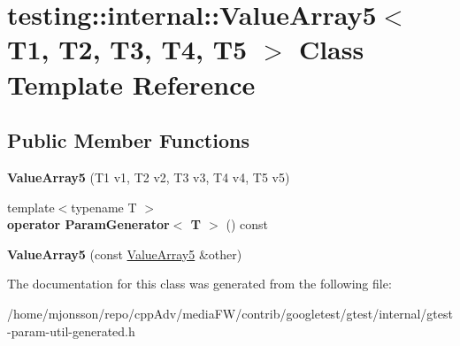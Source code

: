 \hypertarget{classtesting_1_1internal_1_1ValueArray5}{}\section{testing\+:\+:internal\+:\+:Value\+Array5$<$ T1, T2, T3, T4, T5 $>$ Class Template Reference}
\label{classtesting_1_1internal_1_1ValueArray5}
\subsection*{Public Member Functions}
\begin{DoxyCompactItemize}
\item 
\mbox{\label{classtesting_1_1internal_1_1ValueArray5_a9c5687fd18da21263aebc21b9ea508b8}} 
{\bfseries Value\+Array5} (T1 v1, T2 v2, T3 v3, T4 v4, T5 v5)
\item 
\mbox{\label{classtesting_1_1internal_1_1ValueArray5_ab925a168d89be9964c4319e5212222c1}} 
{\footnotesize template$<$typename T $>$ }\\{\bfseries operator Param\+Generator$<$ T $>$} () const
\item 
\mbox{\label{classtesting_1_1internal_1_1ValueArray5_a7de67e844073d0ec3c7c6e5736fb9ba6}} 
{\bfseries Value\+Array5} (const \hyperlink{classtesting_1_1internal_1_1ValueArray5}{Value\+Array5} \&other)
\end{DoxyCompactItemize}


The documentation for this class was generated from the following file\+:\begin{DoxyCompactItemize}
\item 
/home/mjonsson/repo/cpp\+Adv/media\+F\+W/contrib/googletest/gtest/internal/gtest-\/param-\/util-\/generated.\+h\end{DoxyCompactItemize}
